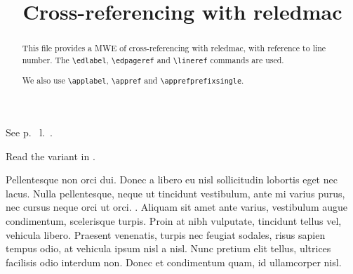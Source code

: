 \documentclass{article}
\renewcommand{\apprefprefixsingle}{l.~}
\begin{document}
\begin{english}
\title{Cross-referencing with reledmac}
\date{}
\maketitle
\begin{abstract}
This file provides a MWE of cross-referencing with reledmac, with reference to line number.
The \verb+\edlabel+, \verb+\edpageref+ and \verb+\lineref+ commands are used. 

We also use \verb+\applabel+, \verb+\appref+ and \verb+\apprefprefixsingle+.

\end{abstract}
\end{english}

See p.~ l.~.

Read the variant in .

\beginnumbering

\pstart
Pellentesque non orci dui. Donec a libero eu nisl sollicitudin lobortis eget nec lacus. Nulla pellentesque, neque ut tincidunt vestibulum, ante mi varius purus, nec cursus neque orci ut orci. . Aliquam sit amet ante varius, vestibulum augue condimentum, scelerisque turpis. Proin at nibh vulputate, tincidunt tellus vel, vehicula libero. Praesent venenatis, turpis nec feugiat sodales, risus sapien tempus odio, at vehicula ipsum nisl a nisl. Nunc pretium elit tellus, ultrices facilisis odio interdum non. Donec et condimentum quam, id ullamcorper nisl.
\pend

\endnumbering
\end{document}
